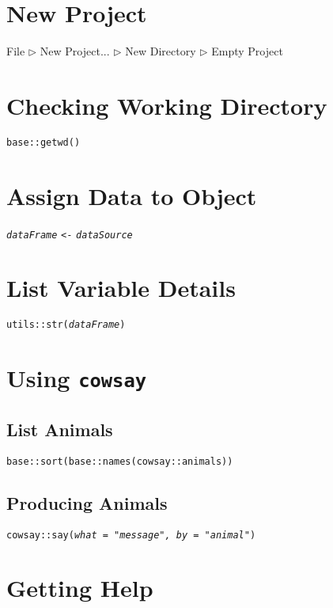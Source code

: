 \documentclass{tufte-handout}
\begin{document}
\vspace{5mm}
\section{New Project}
\textsf{File $\triangleright$ New Project... $\triangleright$ New Directory $\triangleright$ Empty Project}

\vspace{5mm}
\section{Checking Working Directory}
\texttt{base::}{\color{red}\texttt{getwd}}\texttt{()}

\vspace{5mm}
\section{Assign Data to Object}
\texttt{\textit{dataFrame}} {\color{red}\texttt{<-}} \texttt{\textit{dataSource}}

\vspace{5mm}
\section{List Variable Details}%
\texttt{utils::}{\color{red}\texttt{str}}\texttt{(\textit{dataFrame})}

\vspace{5mm}
\section{Using \texttt{cowsay}}
\subsection{List Animals}
\texttt{base::}{\color{red}\texttt{sort}}\texttt{(base::}{\color{red}\texttt{names}}\texttt{(cowsay::animals))}

\vspace{3mm}
\subsection{Producing Animals}
\texttt{cowsay::}{\color{red}\texttt{say}}\texttt{(\textit{what = "\textit{message}", by = "\textit{animal}"})}

\vspace{5mm}
\section{Getting Help}
\end{document}
